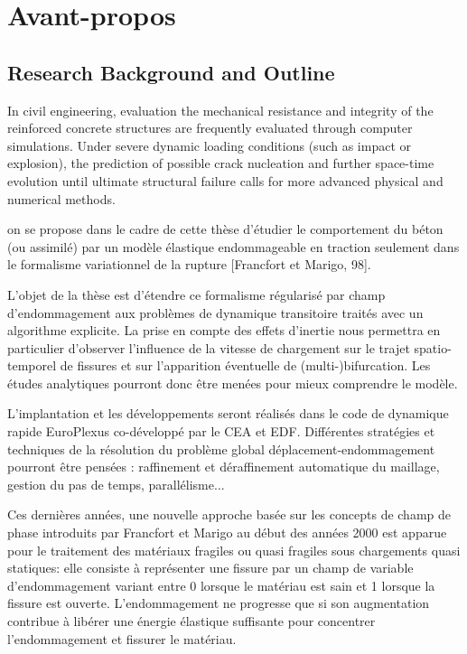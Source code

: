 \chapter{Avant-propos}

\section*{Research Background and Outline}
In civil engineering, evaluation the mechanical resistance and integrity of the reinforced concrete structures are frequently evaluated through computer simulations. Under severe dynamic loading conditions (such as impact or explosion), the prediction of possible crack nucleation and further space-time evolution until ultimate structural failure calls for more advanced physical and numerical methods.



on se propose dans le cadre de cette thèse d'étudier le comportement du béton (ou assimilé)
par un modèle élastique endommageable en traction seulement dans le formalisme variationnel de la rupture [Francfort et Marigo, 98].

L'objet de la thèse est d'étendre ce formalisme régularisé par champ d'endommagement aux problèmes de dynamique transitoire traités avec un
algorithme explicite. La prise en compte des effets d'inertie nous permettra en particulier d'observer l'influence de la vitesse de chargement sur le trajet spatio-temporel
de fissures et sur l'apparition éventuelle de (multi-)bifurcation. Les études analytiques pourront donc être menées pour mieux comprendre le modèle.

L'implantation et les développements seront réalisés dans le code de dynamique rapide EuroPlexus co-développé par le CEA et EDF. Différentes stratégies et techniques
de la résolution du problème global déplacement-endommagement pourront être pensées : raffinement et déraffinement automatique du maillage, gestion du pas de temps,
parallélisme...

Ces dernières années, une nouvelle approche basée sur les concepts de champ de phase introduits
par Francfort et Marigo au début des années 2000 est apparue pour le traitement des matériaux
fragiles ou quasi fragiles sous chargements quasi statiques: elle consiste à représenter une fissure par
un champ de variable d’endommagement variant entre 0 lorsque le matériau est sain et 1 lorsque la
fissure est ouverte. L’endommagement ne progresse que si son augmentation contribue à libérer
une énergie élastique suffisante pour concentrer l’endommagement et fissurer le matériau.

